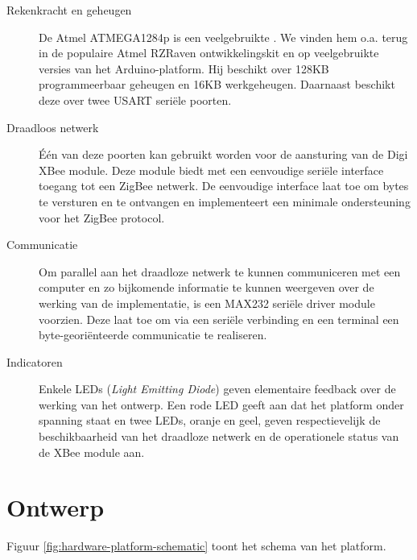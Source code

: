 \begin{description}

  \item[Rekenkracht en geheugen] De Atmel ATMEGA1284p is een veelgebruikte
  \mcu. We vinden hem o.a. terug in de populaire Atmel RZRaven ontwikkelingskit
  en op veelgebruikte versies van het Arduino-platform. Hij beschikt over 128KB
  programmeerbaar geheugen en 16KB werkgeheugen. Daarnaast beschikt deze \mcu
  over twee USART seri\"ele poorten.
  
  \item[Draadloos netwerk] \'E\'en van deze poorten kan gebruikt worden voor de
  aansturing van de Digi XBee module. Deze module biedt met een eenvoudige
  seri\"ele interface toegang tot een ZigBee netwerk. De eenvoudige interface
  laat toe om bytes te versturen en te ontvangen en implementeert een minimale
  ondersteuning voor het ZigBee protocol.
  
  \item[Communicatie] Om parallel aan het draadloze netwerk te kunnen
  communiceren met een computer en zo bijkomende informatie te kunnen weergeven
  over de werking van de implementatie, is een MAX232 seri\"ele driver module
  voorzien. Deze laat toe om via een seri\"ele verbinding en een terminal een
  byte-geori\"enteerde communicatie te realiseren.
  
  \item[Indicatoren] Enkele LEDs (\emph{Light Emitting Diode}) geven
  elementaire feedback over de werking van het ontwerp. Een rode LED geeft aan
  dat het platform onder spanning staat en twee LEDs, oranje en geel, geven
  respectievelijk de beschikbaarheid van het draadloze netwerk en de
  operationele status van de XBee module aan.
  
\end{description}

\section{Ontwerp}

Figuur \ref{fig:hardware-platform-schematic} toont het schema van het platform.

